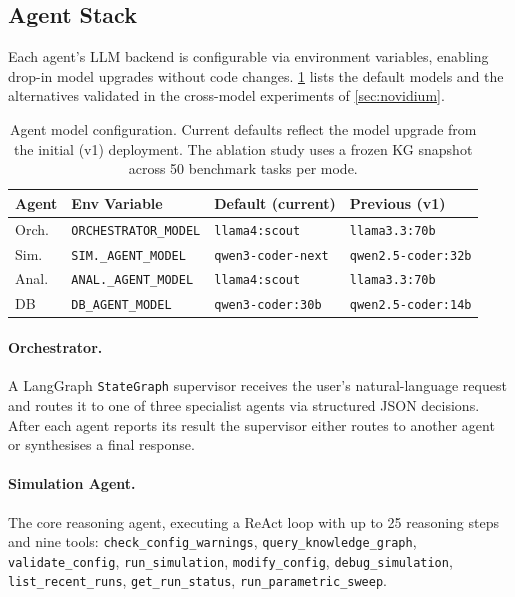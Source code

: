 \documentclass[twocolumn]{article}
\begin{document}
\subsection{Agent Stack}

Each agent's LLM backend is configurable via environment variables,
enabling drop-in model upgrades without code changes.
\cref{tab:agent-models} lists the default models and the alternatives
validated in the cross-model experiments of \cref{sec:novidium}.

\begin{table}[h]
\centering\scriptsize
\caption{Agent model configuration.  Current defaults reflect the
  model upgrade from the initial (v1) deployment.  The ablation study uses a frozen KG snapshot
  across 50 benchmark tasks per mode.}
\label{tab:agent-models}
\setlength{\tabcolsep}{2.5pt}
\begin{tabular}{@{}llll@{}}
\toprule
Agent & Env Variable & Default (current) & Previous (v1) \\
\midrule
Orch.  & \texttt{ORCHESTRATOR\_MODEL} & \texttt{llama4:scout} & \texttt{llama3.3:70b} \\
Sim.   & \texttt{SIM.\_AGENT\_MODEL} & \texttt{qwen3-coder-next} & \texttt{qwen2.5-coder:32b} \\
Anal.  & \texttt{ANAL.\_AGENT\_MODEL} & \texttt{llama4:scout} & \texttt{llama3.3:70b} \\
DB     & \texttt{DB\_AGENT\_MODEL} & \texttt{qwen3-coder:30b} & \texttt{qwen2.5-coder:14b} \\
\bottomrule
\end{tabular}
\end{table}

\paragraph{Orchestrator.}
A LangGraph \texttt{StateGraph} supervisor receives the user's
natural-language request and routes it to one of three specialist agents via
structured JSON decisions.  After each agent reports its result the
supervisor either routes to another agent or synthesises a final response.

\paragraph{Simulation Agent.}
The core reasoning agent, executing a ReAct loop \citep{yao2023react}
with up to 25 reasoning steps and nine tools:
\texttt{check\_config\_warnings},
\texttt{query\_knowledge\_graph},
\texttt{validate\_config},
\texttt{run\_simulation},
\texttt{modify\_config},
\texttt{debug\_simulation},
\texttt{list\_recent\_runs},
\texttt{get\_run\_status},
\texttt{run\_parametric\_sweep}.
\end{document}
